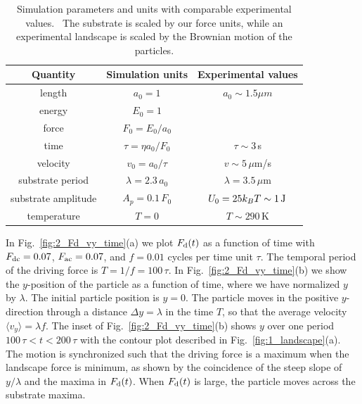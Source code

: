 \documentclass[preprint,showpacs,preprintnumbers,amsmath,amssymb,aps,prb]{revtex4-1}
\theoremstyle{remark}
\begin{document}
\begin{table}[h!]
\centering
\caption{Simulation parameters and units with comparable
  experimental values.~\cite{Juniper2015,Juniper2017} The substrate is scaled by our force units, while an experimental landscape is scaled by the Brownian motion of the particles. }
\begin{ruledtabular}
\begin{tabular}{c c c } 
Quantity & Simulation units & Experimental values\\
\hline
length &  $a_0 = 1$ & $ a_0 \sim 1.5 \mu m$\\
energy & $E_0 = 1$ & \\ %
force & $F_0 = E_0 / a_0$ & \\ %
time &  $ \tau = \eta a_0 / F_0 $ & $ \tau \sim 3$\,s\\
velocity &  $ v_0 = a_0 / \tau $ &  $v \sim 5\,\mu$m/s \\
substrate period & $\lambda = 2.3\,a_0$ & $\lambda = 3.5\,\mu$m \\
substrate amplitude & $A_p = 0.1\,F_0$ & $U_0 = 25 k_B T \sim 1\, {\rm J}$ \\ %
temperature & $T = 0$  & $T \sim 290\,$K  \\
\end{tabular}
\end{ruledtabular}
\label{tab:1}
\end{table}

In Fig.~\ref{fig:2_Fd_vy_time}(a)
we plot $F_{\rm d}(t)$ 
as a function of time with $F_{\rm dc}=0.07$, 
$F_{\rm ac}=0.07$, and $f=0.01$ cycles per time unit $\tau$.
The  temporal period of the driving force is
$T = 1/f = 100\,\tau$.
In Fig.~\ref{fig:2_Fd_vy_time}(b) 
we show the $y$-position of the particle
as a function of time,
where we have
normalized $y$ by $\lambda$.
The initial particle position is $y = 0$. 
The particle moves
in the positive $y$-direction
through a distance $\Delta y = \lambda$  in the time $T$,
so that  
the average velocity 
$\langle {v}_y \rangle = \lambda f$. 
The inset of Fig.~\ref{fig:2_Fd_vy_time}(b)
shows $y$ 
over one period $100\,\tau < t < 200\,\tau$
with 
the contour plot described
in Fig.~\ref{fig:1_landscape}(a).
The motion is synchronized such that the 
driving force is a maximum when the landscape 
force is minimum,
as shown by the coincidence of the
steep slope of 
$y/\lambda$ 
and the maxima in $F_{\rm d}(t)$.
When $F_{\rm d}(t)$ is large,
the particle moves across the substrate maxima.
\end{document}
